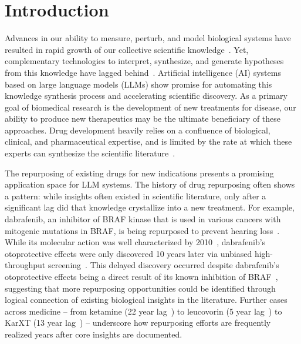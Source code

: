\documentclass{article}
\begin{document}


\section{Introduction}
Advances in our ability to measure, perturb, and model biological systems have resulted in rapid growth of our collective scientific knowledge~\cite{stephens_big_2015}. Yet, complementary technologies to interpret, synthesize, and generate hypotheses from this knowledge have lagged behind~\cite{nurse_biology_2021}. Artificial intelligence (AI) systems based on large language models (LLMs) show promise for automating this knowledge synthesis process and accelerating scientific discovery. As a primary goal of biomedical research is the development of new treatments for disease, our ability to produce new therapeutics may be the ultimate beneficiary of these approaches. Drug development heavily relies on a confluence of biological, clinical, and pharmaceutical expertise, and is limited by the rate at which these experts can synthesize the scientific literature~\cite{cheng_importance_2020}.

The repurposing of existing drugs for new indications presents a promising application space for LLM systems. The history of drug repurposing often shows a pattern: while insights often existed in scientific literature, only after a significant lag did that knowledge crystallize into a new treatment. For example, dabrafenib, an inhibitor of BRAF kinase that is used in various cancers with mitogenic mutations in BRAF, is being repurposed to prevent hearing loss~\cite{ingersoll_braf_2020, ingersoll_dabrafenib_nodate}. While its molecular action was well characterized by 2010~\cite{noauthor_clinical_nodate, glaxosmithkline_phase_2017, ribas_braf_2011}, dabrafenib's otoprotective effects were only discovered 10 years later via unbiased high-throughput screening~\cite{noauthor_clinical_nodate}. This delayed discovery occurred despite dabrafenib’s otoprotective effects being a direct result of its known inhibition of BRAF~\cite{ingersoll_braf_2020, lahne_damage-induced_2008, ingersoll_dabrafenib_nodate}, suggesting that more repurposing opportunities could be identified through logical connection of existing biological insights in the literature. Further cases across medicine – from ketamine (22 year lag~\cite{berman_antidepressant_2000, noauthor_pcp_nodate}) to leucovorin (5 year lag~\cite{frye_cerebral_2013, ramaekers_folate_2008}) to KarXT (13 year lag~\cite{sauerberg_novel_1992, noauthor_krtx-10k_20191231htm_nodate}) – underscore how repurposing efforts are frequently realized years after core insights are documented.
\end{document}
